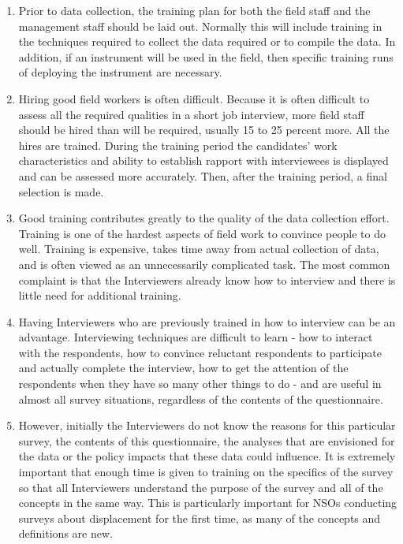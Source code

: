 \documentclass[
]{article}
\begin{document}
\begin{enumerate}
\def\labelenumi{\arabic{enumi}.}
\setcounter{enumi}{333}
\item
  Prior to data collection, the training plan for both the field
  staff and the management staff should be laid out. Normally this
  will include training in the techniques required to collect the data
  required or to compile the data. In addition, if an instrument will
  be used in the field, then specific training runs of deploying the
  instrument are necessary.
\item
  Hiring good field workers is often difficult. Because it is often
  difficult to assess all the required qualities in a short job
  interview, more field staff should be hired than will be required,
  usually 15 to 25 percent more. All the hires are trained. During the
  training period the candidates' work characteristics and ability to
  establish rapport with interviewees is displayed and can be assessed
  more accurately. Then, after the training period, a final selection
  is made.
\item
  Good training contributes greatly to the quality of the data
  collection effort. Training is one of the hardest aspects of field
  work to convince people to do well. Training is expensive, takes
  time away from actual collection of data, and is often viewed as an
  unnecessarily complicated task. The most common complaint is that
  the Interviewers already know how to interview and there is little
  need for additional training.
\item
  Having Interviewers who are previously trained in how to interview
  can be an advantage. Interviewing techniques are difficult to
  learn - how to interact with the respondents, how to convince
  reluctant respondents to participate and actually complete the
  interview, how to get the attention of the respondents when they
  have so many other things to do - and are useful in almost all
  survey situations, regardless of the contents of the questionnaire.
\item
  However, initially the Interviewers do not know the reasons for
  this particular survey, the contents of this questionnaire, the
  analyses that are envisioned for the data or the policy impacts that
  these data could influence. It is extremely important that enough
  time is given to training on the specifics of the survey so that all
  Interviewers understand the purpose of the survey and all of the
  concepts in the same way. This is particularly important for NSOs
  conducting surveys about displacement for the first time, as many of
  the concepts and definitions are new.
\end{enumerate}
\end{document}
